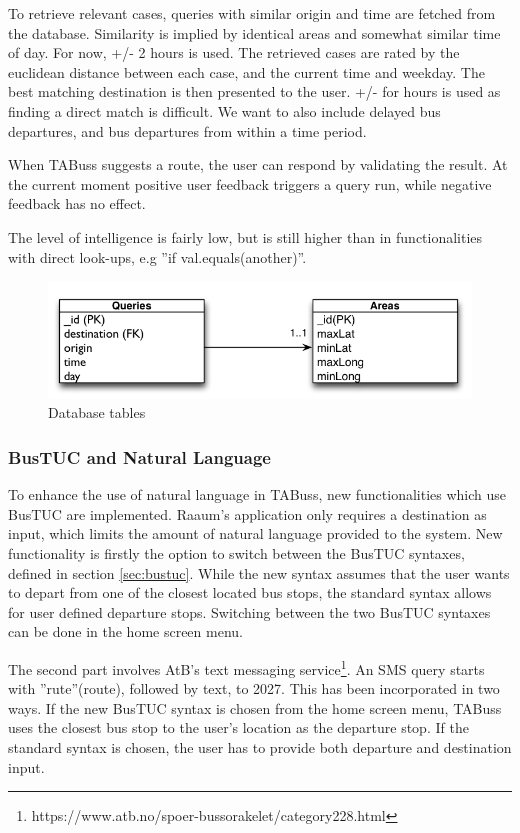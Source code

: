 To retrieve relevant cases, queries with similar origin and time are fetched from the database. Similarity is implied by identical areas and somewhat similar time of day. For now, +/- 2 hours is used. The retrieved cases are rated by the euclidean distance between each case, and the current time and weekday. The best matching destination is then presented to the user. +/- for hours is used as finding a direct match is difficult. We want to also include delayed bus departures, and bus departures from within a time period.

When TABuss suggests a route, the user can respond by validating the result. At the current moment positive user feedback triggers a query run, while negative feedback has no effect.

The level of intelligence is fairly low, but is still higher than in functionalities with direct look-ups, e.g ''if val.equals(another)''. 

\begin{figure}[!h]
\begin{center}
\includegraphics[scale=0.3]{Intelligence/database.png}
\caption{Database tables}
\end{center}
\end{figure}
\newpage
\subsubsection{BusTUC and Natural Language}
To enhance the use of natural language in TABuss, new functionalities which use BusTUC are implemented. Raaum's application only requires a destination as input, which limits the amount of natural language provided to the system. New functionality is firstly the option to switch between the BusTUC syntaxes, defined in section \ref{sec:bustuc}. While the new syntax assumes that the user wants to depart from one of the closest located bus stops, the standard syntax allows for user defined departure stops. Switching between the two BusTUC syntaxes can be done in the home screen menu.

The second part involves AtB's text messaging service\footnote{https://www.atb.no/spoer-bussorakelet/category228.html}. An SMS query starts with ''rute''(route), followed by text, to 2027. This has been incorporated in two ways. If the new BusTUC syntax is chosen from the home screen menu, TABuss uses the closest bus stop to the user's location as the departure stop. If the standard syntax is chosen, the user has to provide both departure and destination input.


